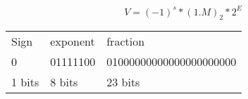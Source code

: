 \documentclass[en, 11pt, xcolor=dvipsnames]{beamer}
\begin{document}
\begin{frame}[fragile]


	\begin{columns}[c]
		\begin{column}{0.9\textwidth}

			\[
				V = (-1)^s * (1.M)_{2} * 2^E
			\]

			\begin{table}
				\begin{tabular}{l l l}
					Sign   & exponent & fraction                \\
					0      & 01111100 & 01000000000000000000000 \\
					1 bits & 8 bits   & 23 bits                 \\
				\end{tabular}
			\end{table}

		\end{column}
	\end{columns}

\end{frame}
\end{document}
